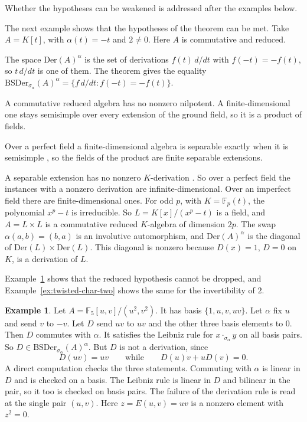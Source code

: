 \documentclass[]{interact}
\theoremstyle{plain}
\theoremstyle{definition}
\newtheorem{example}[theorem]{Example}
\theoremstyle{remark}
\newcommand{\Der}{\mathrm{Der}}
\newcommand{\BSDer}{\mathrm{BSDer}}
\begin{document}
Whether the hypotheses can be weakened is addressed after the examples below. %

The next example shows that the hypotheses of the theorem can be met. %
Take $A = K[t]$, with $\alpha(t) = -t$ and $2 \ne 0$. Here $A$ is commutative and reduced.

The space $\Der(A)^\alpha$ is the set of derivations $f(t)\,d/dt$ with $f(-t) = -f(t)$, so $t\,d/dt$ is one of them. The theorem gives the equality $\BSDer_{\sigma_\alpha}(A)^\alpha = \{f\,d/dt : f(-t) = -f(t)\}$.

A commutative reduced algebra has no nonzero nilpotent. A finite-dimensional one stays semisimple over every extension of the ground field, so it is a product of fields. %

Over a perfect field a finite-dimensional algebra is separable exactly when it is semisimple \citep[\S10.7, Corollary~b]{Pierce1982}, so the fields of the product are finite separable extensions.

A separable extension has no nonzero $K$-derivation \citep[Lemma 9.2.1 and Theorem 9.2.11]{Weibel1994}. %
So over a perfect field the instances with a nonzero derivation are infinite-dimensional. Over an imperfect field there are finite-dimensional ones. For odd $p$, with $K = \mathbb{F}_p(t)$, the polynomial $x^p - t$ is irreducible. So $L = K[x]/(x^p - t)$ is a field, and $A = L \times L$ is a commutative reduced $K$-algebra of dimension $2p$. The swap $\alpha(a,b) = (b,a)$ is an involutive automorphism, and $\Der(A)^\alpha$ is the diagonal of $\Der(L) \times \Der(L)$. This diagonal is nonzero because $D(x) = 1$, $D = 0$ on $K$, is a derivation of $L$.

Example~\ref{ex:twisted-nilpotent} shows that the reduced hypothesis cannot be dropped, and Example~\ref{ex:twisted-char-two} shows the same for the invertibility of $2$.

\begin{example}\label{ex:twisted-nilpotent}
Let $A = \mathbb{F}_5[u,v]/(u^2, v^2)$.
It has basis $\{1, u, v, uv\}$.
Let $\alpha$ fix $u$ and send $v$ to $-v$.
Let $D$ send $uv$ to $uv$ and the other three basis elements to $0$.
Then $D$ commutes with $\alpha$.
It satisfies the Leibniz rule for $x \cdot_{\sigma_\alpha} y$ on all basis pairs.
So $D \in \BSDer_{\sigma_\alpha}(A)^\alpha$.
But $D$ is not a derivation, since
\[
D(uv) = uv \qquad \text{while} \qquad D(u)v + uD(v) = 0.
\]
A direct computation checks the three statements. Commuting with $\alpha$ is linear in $D$ and is checked on a basis. The Leibniz rule is linear in $D$ and bilinear in the pair, so it too is checked on basis pairs. The failure of the derivation rule is read at the single pair $(u,v)$.
Here $z = E(u,v) = uv$ is a nonzero element with $z^2 = 0$.
\end{example}
\end{document}
